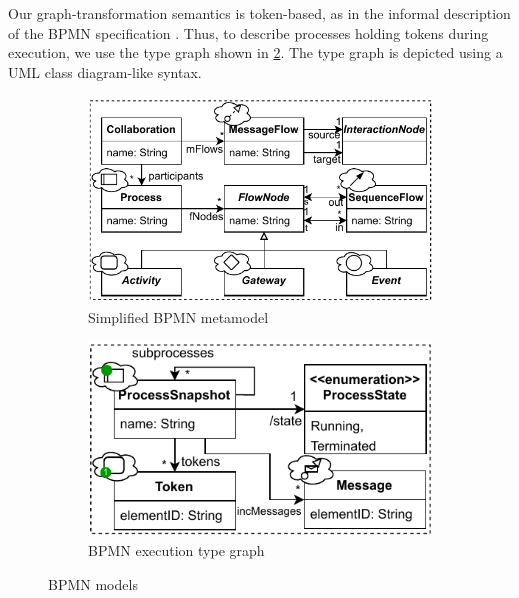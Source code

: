 \documentclass[submission, copyright, creativecommons]{eptcs}
\begin{document}
Our graph-transformation semantics is token-based, as in the informal description of the BPMN specification \cite{objectmanagementgroupBusinessProcessModel2013}.
Thus, to describe processes holding tokens during execution, we use the type graph shown in \cref{fig:typeGraph}.
The type graph is depicted using a UML class diagram-like syntax.

\begin{figure}
\centering
\begin{subfigure}{.5\textwidth}
  \centering
  \includegraphics[width=1\linewidth]{images/bpmn_semantics-bpmn-metamodel.pdf}
  \caption{Simplified BPMN metamodel \cite{objectmanagementgroupBusinessProcessModel2013}}
  \label{fig:bpmnMetamodel}
\end{subfigure}%
\begin{subfigure}{.50\textwidth}
  \centering
  \includegraphics[width=1\linewidth]{images/bpmn_semantics-typegraph.pdf}
  \caption{BPMN execution type graph}
  \label{fig:typeGraph}
\end{subfigure}
\caption{BPMN models}
\label{fig:bpmnModels}
\end{figure}
\end{document}
